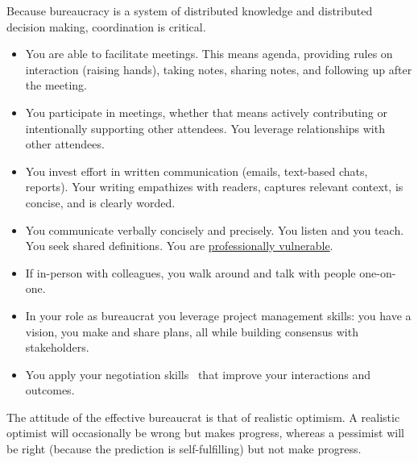 Because bureaucracy is a system of distributed knowledge and distributed decision making, coordination is critical. 
\begin{itemize}
    \item You are able to facilitate meetings. This means agenda, providing rules on interaction (raising hands), taking notes, sharing notes, and following up after the meeting.
    \item You participate in meetings, whether that means actively contributing or intentionally supporting other attendees. You leverage relationships with other attendees. 
    \item You invest effort in written communication (emails, text-based chats, reports). Your writing empathizes with readers, captures relevant context, is concise, and is clearly worded.
    \item You communicate verbally concisely and precisely. You listen and you teach. You seek shared definitions. You are \hyperref[sec:professional-vulnerablity]{professionally vulnerable}. 
    \item If in-person with colleagues, you walk around and talk with people one-on-one.  
    \item In your role as bureaucrat you leverage project management skills: you have a vision, you make and share plans, all while building consensus with stakeholders.
    \item You apply your negotiation skills~\cite{1982_Cohen} that improve your interactions and outcomes.
\end{itemize}

The attitude of the effective bureaucrat  is that of realistic optimism. A realistic optimist will occasionally be wrong but makes progress, whereas a pessimist will be right (because the prediction is self-fulfilling) but not make progress.
